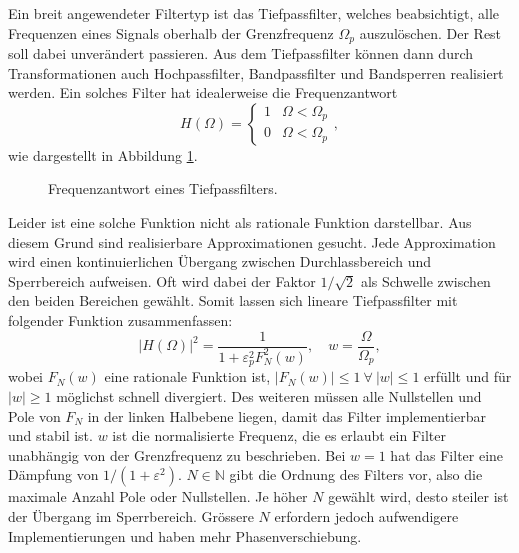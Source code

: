 Ein breit angewendeter Filtertyp ist das Tiefpassfilter, welches beabsichtigt, alle Frequenzen eines Signals oberhalb der Grenzfrequenz $\Omega_p$ auszulöschen.
%
Der Rest soll dabei unverändert passieren.
Aus dem Tiefpassfilter können dann durch Transformationen auch Hochpassfilter, Bandpassfilter und Bandsperren realisiert werden.
%
%
%
Ein solches Filter hat idealerweise die Frequenzantwort
\begin{equation}
    H(\Omega) =
    \begin{cases}
        1  & \Omega < \Omega_p \\
        0  & \Omega < \Omega_p
    \end{cases},
\end{equation}
wie dargestellt in Abbildung \ref{ellfilter:fig:lp}.
\begin{figure}
    \centering
    
    \caption{Frequenzantwort eines Tiefpassfilters.}
    \label{ellfilter:fig:lp}
\end{figure}
Leider ist eine solche Funktion nicht als rationale Funktion darstellbar.
Aus diesem Grund sind realisierbare Approximationen gesucht.
Jede Approximation wird einen kontinuierlichen Übergang zwischen Durchlassbereich und Sperrbereich aufweisen.
%
%
Oft wird dabei der Faktor $1/\!\sqrt{2}$ als Schwelle zwischen den beiden Bereichen gewählt.
Somit lassen sich lineare Tiefpassfilter mit folgender Funktion zusammenfassen:
\begin{equation} \label{ellfilter:eq:quadratic_transfer}
    | H(\Omega)|^2 = \frac{1}{1 + \varepsilon_p^2 F_N^2(w)}, \quad w=\frac{\Omega}{\Omega_p},
\end{equation}
wobei $F_N(w)$ eine rationale Funktion ist, $|F_N(w)| \leq 1 ~\forall~ |w| \leq 1$ erfüllt und für $|w| \geq 1$ möglichst schnell divergiert.
Des weiteren müssen alle Nullstellen und Pole von $F_N$ in der linken Halbebene liegen, damit das Filter implementierbar und stabil ist.
$w$ ist die normalisierte Frequenz, die es erlaubt ein Filter unabhängig von der Grenzfrequenz zu beschrieben.
Bei $w=1$ hat das Filter eine Dämpfung von $1/(1+\varepsilon^2)$.
$N \in \mathbb{N} $ gibt die Ordnung des Filters vor, also die maximale Anzahl Pole oder Nullstellen.
Je höher $N$ gewählt wird, desto steiler ist der Übergang im Sperrbereich.
Grössere $N$ erfordern jedoch aufwendigere Implementierungen und haben mehr Phasenverschiebung.
%

